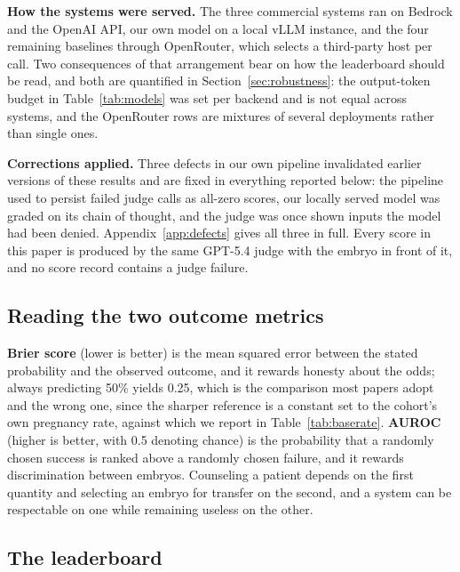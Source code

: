\textbf{How the systems were served.} The three commercial systems ran on Bedrock
and the OpenAI API, our own model on a local vLLM instance, and the four
remaining baselines through OpenRouter, which selects a third-party host per
call. Two consequences of that arrangement bear on how the leaderboard should be
read, and both are quantified in Section~\ref{sec:robustness}: the output-token
budget in Table~\ref{tab:models} was set per backend and is not equal across
systems, and the OpenRouter rows are mixtures of several deployments rather than
single ones.

\textbf{Corrections applied.} Three defects in our own pipeline invalidated
earlier versions of these results and are fixed in everything reported below: the
pipeline used to persist failed judge calls as all-zero scores, our locally
served model was graded on its chain of thought, and the judge was once shown
inputs the model had been denied. Appendix~\ref{app:defects} gives all three in
full. Every score in this paper is produced by the same GPT-5.4 judge with the
embryo in front of it, and no score record contains a judge failure.

\subsection{Reading the two outcome metrics}

\textbf{Brier score} (lower is better) is the mean squared error between the
stated probability and the observed outcome, and it rewards honesty about the
odds; always predicting 50\% yields 0.25, which is the comparison most papers
adopt and the wrong one, since the sharper reference is a constant set to the
cohort's own pregnancy rate, against which we report in
Table~\ref{tab:baserate}. \textbf{AUROC} (higher is better, with 0.5 denoting
chance) is the probability that a randomly chosen success is ranked above a
randomly chosen failure, and it rewards discrimination between embryos.
Counseling a patient depends on the first quantity and selecting an embryo for
transfer on the second, and a system can be respectable on one while remaining
useless on the other.

\subsection{The leaderboard}

